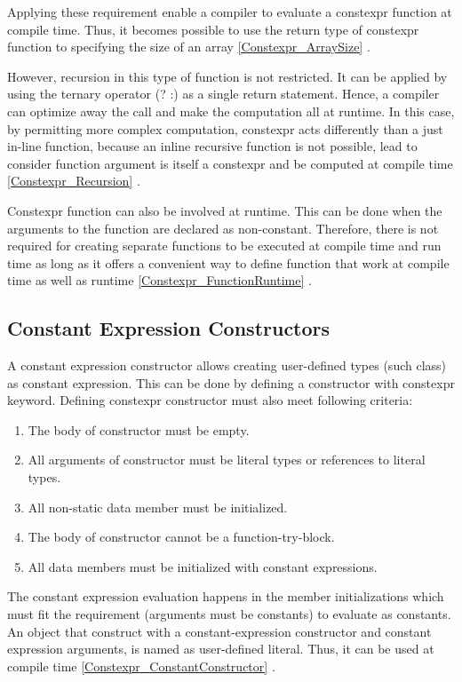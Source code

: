 \documentclass[11pt]{report}
\begin{document}
Applying these requirement enable a compiler to evaluate a constexpr function at compile time. Thus, it becomes possible to use the return type of constexpr function to specifying the size of an array \ref{Constexpr_ArraySize} \cite{Gregorie:professionalcpp}.

However, recursion in this type of function is not restricted. It can be applied by using the ternary operator (? :) as a single return statement. Hence, a compiler can optimize away the call and make the computation all at runtime. In this case, by permitting more complex computation, constexpr acts differently than a just in-line function, because an inline recursive function is not possible, lead to consider function argument is itself a constexpr and be computed at compile time \ref{Constexpr_Recursion} \cite{Allain:2011:FutureCpp}.


Constexpr function can also be involved at runtime. This can be done when the arguments to the function are declared as non-constant. Therefore, there is not required for creating separate functions to be executed at compile time and run time as long as it offers a convenient way to define function that work at compile time as well as runtime \ref{Constexpr_FunctionRuntime} \cite{Allain:2011:FutureCpp}.

\subsection{Constant Expression Constructors}
\label{subsection: Constant Expression Constructors}
A constant expression constructor allows creating user-defined types (such class) as constant expression. This can be done by defining a constructor with constexpr keyword. Defining constexpr constructor must also meet following criteria:

\begin{enumerate}
\item	The body of constructor must be empty.
\item	All arguments of constructor must be literal types or references to literal types.
\item   All non-static data member must be initialized.
\item	The body of constructor cannot be a function-try-block.
\item	All data members must be initialized with constant expressions.
\end{enumerate}

The constant expression evaluation happens in the member initializations which must fit the requirement (arguments must be constants) to evaluate as constants. An object that construct with a constant-expression constructor and constant expression arguments, is named as user-defined literal. Thus, it can be used at compile time \ref{Constexpr_ConstantConstructor} \cite{Gregorie:professionalcpp}.
\end{document}
